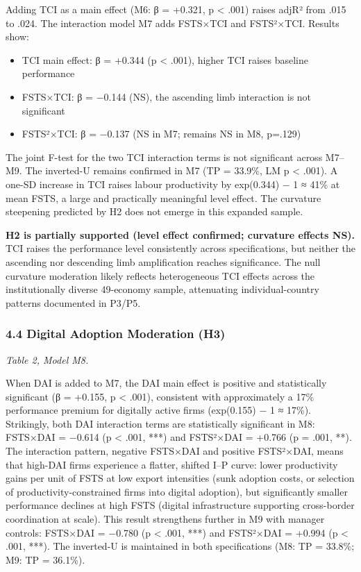 \documentclass[12pt,a4paper]{article}
\providecommand{\tightlist}{\setlength{\itemsep}{0pt}\setlength{\parskip}{0pt}}
\begin{document}
Adding TCI as a main effect (M6: β = +0.321, p \textless{} .001) raises
adjR² from .015 to .024. The interaction model M7 adds FSTS×TCI and
FSTS²×TCI. Results show:

\begin{itemize}
\tightlist
\item
  TCI main effect: β = +0.344 (p \textless{} .001), higher TCI raises
  baseline performance
\item
  FSTS×TCI: β = −0.144 (NS), the ascending limb interaction is not
  significant
\item
  FSTS²×TCI: β = −0.137 (NS in M7; remains NS in M8, p=.129)
\end{itemize}

The joint F-test for the two TCI interaction terms is not significant
across M7--M9. The inverted-U remains confirmed in M7 (TP = 33.9\%, LM p
\textless{} .001). A one-SD increase in TCI raises labour productivity
by exp(0.344) − 1 ≈ 41\% at mean FSTS, a large and practically
meaningful level effect. The curvature steepening predicted by H2 does
not emerge in this expanded sample.

\textbf{H2 is partially supported (level effect confirmed; curvature
effects NS).} TCI raises the performance level consistently across
specifications, but neither the ascending nor descending limb
amplification reaches significance. The null curvature moderation likely
reflects heterogeneous TCI effects across the institutionally diverse
49-economy sample, attenuating individual-country patterns documented in
P3/P5.

\hypertarget{44-digital-adoption-moderation-h3}{%
\subsubsection{4.4 Digital Adoption Moderation
(H3)}\label{44-digital-adoption-moderation-h3}}

\emph{Table 2, Model M8.}

When DAI is added to M7, the DAI main effect is positive and
statistically significant (β = +0.155, p \textless{} .001), consistent
with approximately a 17\% performance premium for digitally active firms
(exp(0.155) − 1 ≈ 17\%). Strikingly, both DAI interaction terms are
statistically significant in M8: FSTS×DAI = −0.614 (p \textless{} .001,
***) and FSTS²×DAI = +0.766 (p = .001, **). The interaction pattern,
negative FSTS×DAI and positive FSTS²×DAI, means that high-DAI firms
experience a flatter, shifted I--P curve: lower productivity gains per
unit of FSTS at low export intensities (sunk adoption costs, or
selection of productivity-constrained firms into digital adoption), but
significantly smaller performance declines at high FSTS (digital
infrastructure supporting cross-border coordination at scale). This
result strengthens further in M9 with manager controls: FSTS×DAI =
−0.780 (p \textless{} .001, ***) and FSTS²×DAI = +0.994 (p \textless{}
.001, ***). The inverted-U is maintained in both specifications (M8: TP
= 33.8\%; M9: TP = 36.1\%).
\end{document}
